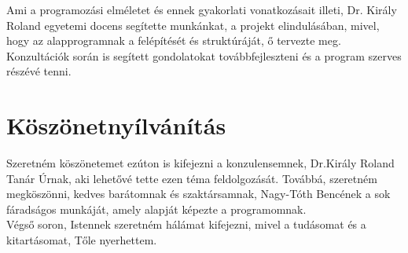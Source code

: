 \documentclass[tocnopagenum]{thesis-ekf}
\theoremstyle{definition}
\theoremstyle{remark}
\begin{document}
	Ami a programozási elméletet és ennek gyakorlati vonatkozásait illeti, Dr. Király Roland  egyetemi docens segítette munkánkat, a projekt elindulásában, mivel, hogy az alapprogramnak a felépítését és struktúráját, ő tervezte meg. Konzultációk során is segített gondolatokat továbbfejleszteni és a program szerves részévé tenni.

	\chapter*{Köszönetnyílvánítás}
	Szeretném köszönetemet ezúton is kifejezni a konzulensemnek, Dr.Király Roland Tanár Úrnak, aki lehetővé tette ezen téma feldolgozását.
	Továbbá, szeretném megköszönni, kedves barátomnak és szaktársamnak, Nagy-Tóth Bencének a sok fáradságos munkáját, amely alapját képezte a programomnak. 
	\\
	Végső soron, Istennek szeretném hálámat kifejezni, mivel a tudásomat és a kitartásomat, Tőle nyerhettem. 
	


	
	

	\listoffigures
\end{document}
